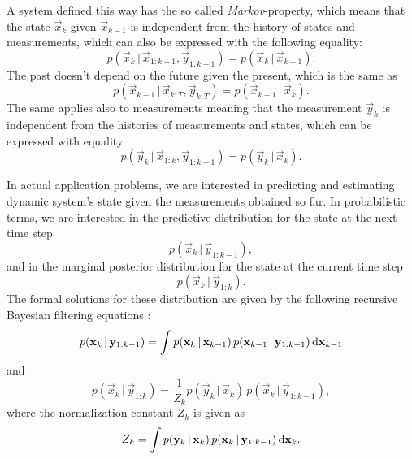 A system defined this way has the so called \emph{Markov}-property,
which means that the state $\vec{x}_k$ given $\vec{x}_{k-1}$ is
independent from the history of states and measurements, which can
also be expressed with the following equality:
%
\begin{equation} p(\vec{x}_k\,|\,\vec{x}_{1:k-1},\vec{y}_{1:k-1}) =
p(\vec{x}_k\,|\,\vec{x}_{k-1}).
\end{equation}
%
The past doesn't depend on the future given the present, which is the
same as
%
\begin{equation} p(\vec{x}_{k-1}\,|\,\vec{x}_{k:T},\vec{y}_{k:T}) =
p(\vec{x}_{k-1}\,|\,\vec{x}_{k}).
\end{equation}
% 
The same applies also to measurements meaning that the measurement
$\vec{y}_k$ is independent from the histories of measurements and
states, which can be expressed with equality
%
\begin{equation} p(\vec{y}_k\,|\,\vec{x}_{1:k},\vec{y}_{1:k-1}) =
p(\vec{y}_k\,|\,\vec{x}_{k}).
\end{equation}


In actual application problems, we are interested in predicting and
estimating dynamic system's state given the measurements obtained so
far. In probabilistic terms, we are interested in the predictive
distribution for the state at the next time step
%
\begin{equation} p(\vec{x}_{k}\,|\,\vec{y}_{1:k-1}),
\end{equation}
%
and in the marginal posterior distribution for the state at the
current time step
%
\begin{equation} p(\vec{x}_{k}\,|\,\vec{y}_{1:k}).
\end{equation}
%
The formal solutions for these distribution are given by the following
recursive Bayesian filtering equations  \citep[e.g.][]{Sarkka:2006b}:
%
\begin{equation} p(\mathbf{x}_k\,|\,\mathbf{y}_{1:k-1}) = \int
p(\mathbf{x}_k\,|\,\mathbf{x}_{k-1}) \, p(\mathbf{x}_{k-1}\,|\,\mathbf{y}_{1:k-1})
\, \mathrm{d}\mathbf{x}_{k-1}
\label{eq:bayesf_p}
\end{equation} and
\begin{equation} p(\vec{x}_k\,|\,\vec{y}_{1:k}) = \frac{1}{Z_k}
p(\vec{y}_k\,|\,\vec{x}_k) \, p(\vec{x}_k\,|\,\vec{y}_{1:k-1}),
\label{eq:bayesf_u}
\end{equation} where the normalization constant $Z_k$ is given as
\begin{equation} Z_k = \int p(\mathbf{y}_k\,|\,\mathbf{x}_k) \,
p(\mathbf{x}_k\,|\,\mathbf{y}_{1:k-1}) \, \mathrm{d}\mathbf{x}_k.
\label{eq:zk}
\end{equation}
%

